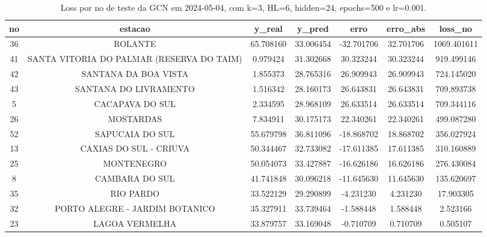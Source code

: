 \begin{table}[h]
\centering
\caption{Loss por no de teste da GCN em 2024-05-04, com k=3, HL=6, hidden=24, epochs=500 e lr=0.001.}
\label{tab:gcn_loss_k3_hl6_h24_e500_d20240504}
\begin{tabular}{ccccccc}
\toprule
no & estacao & y\_real & y\_pred & erro & erro\_abs & loss\_no \\
\midrule
36 & ROLANTE & 65.708160 & 33.006454 & -32.701706 & 32.701706 & 1069.401611 \\
41 & SANTA VITORIA DO PALMAR (RESERVA DO TAIM) & 0.979424 & 31.302668 & 30.323244 & 30.323244 & 919.499146 \\
42 & SANTANA DA BOA VISTA & 1.855373 & 28.765316 & 26.909943 & 26.909943 & 724.145020 \\
43 & SANTANA DO LIVRAMENTO & 1.516342 & 28.160173 & 26.643831 & 26.643831 & 709.893738 \\
5 & CACAPAVA DO SUL & 2.334595 & 28.968109 & 26.633514 & 26.633514 & 709.344116 \\
26 & MOSTARDAS & 7.834911 & 30.175173 & 22.340261 & 22.340261 & 499.087280 \\
52 & SAPUCAIA DO SUL & 55.679798 & 36.811096 & -18.868702 & 18.868702 & 356.027924 \\
13 & CAXIAS DO SUL - CRIUVA & 50.344467 & 32.733082 & -17.611385 & 17.611385 & 310.160889 \\
25 & MONTENEGRO & 50.054073 & 33.427887 & -16.626186 & 16.626186 & 276.430084 \\
8 & CAMBARA DO SUL & 41.741848 & 30.096218 & -11.645630 & 11.645630 & 135.620697 \\
35 & RIO PARDO & 33.522129 & 29.290899 & -4.231230 & 4.231230 & 17.903305 \\
32 & PORTO ALEGRE - JARDIM BOTANICO & 35.327911 & 33.739464 & -1.588448 & 1.588448 & 2.523166 \\
23 & LAGOA VERMELHA & 33.879757 & 33.169048 & -0.710709 & 0.710709 & 0.505107 \\
\bottomrule
\end{tabular}
\end{table}
